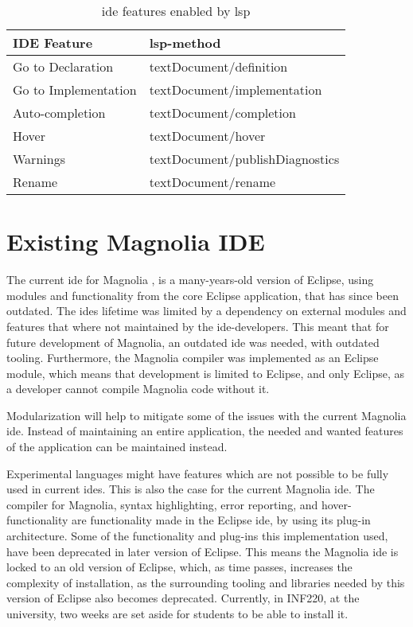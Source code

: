 \begin{table}[]
  \centering
  \caption{\gls{ide} features enabled by \gls{lsp}}
  \label{tbl:ide}
  \begin{tabular}{|l|l|}
    \hline
    IDE Feature & \gls{lsp}-method \\ \hline
    Go to Declaration & textDocument/definition \\ \hline
    Go to Implementation & textDocument/implementation \\ \hline
    Auto-completion & textDocument/completion \\ \hline
    Hover & textDocument/hover \\ \hline
    Warnings & textDocument/publishDiagnostics \\ \hline
    Rename & textDocument/rename \\ \hline
  \end{tabular}
\end{table}

\section{Existing Magnolia IDE}

The current \gls{ide} for Magnolia \cite{baggeIde}, is a many-years-old version
of Eclipse, using modules and functionality from the core Eclipse application,
that has since been outdated. The \gls{ide}s lifetime was limited by a
dependency on external modules and features that where not maintained by the
\gls{ide}-developers. This meant that for future development of Magnolia, an
outdated \gls{ide} was needed, with outdated tooling. Furthermore, the Magnolia
compiler was implemented as an Eclipse module, which means that development is
limited to Eclipse, and only Eclipse, as a developer cannot compile Magnolia
code without it.

Modularization will help to mitigate some of the issues with the current
Magnolia \gls{ide}. Instead of maintaining an entire application, the needed and
wanted features of the application can be maintained instead.

Experimental languages might have features which are not possible to be fully
used in current \gls{ide}s. This is also the case for the current Magnolia
\gls{ide}. The compiler for Magnolia, syntax highlighting, error reporting, and
hover-functionality are functionality made in the Eclipse \gls{ide}, by using
its plug-in architecture. Some of the functionality and plug-ins this
implementation used, have been deprecated in later version of Eclipse. This
means the Magnolia \gls{ide} is locked to an old version of Eclipse, which, as
time passes, increases the complexity of installation, as the surrounding
tooling and libraries needed by this version of Eclipse also becomes deprecated.
Currently, in INF220, at the university, two weeks are set aside for students to
be able to install it.

